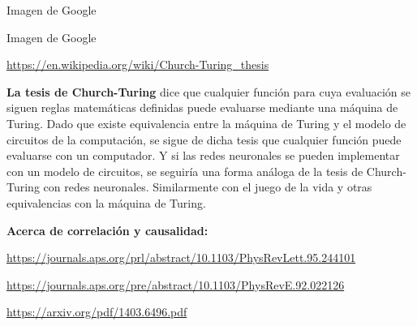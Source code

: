 \documentclass[10pd,hyperref={colorlinks=true}]{beamer}
\begin{document}

\begin{frame}{}

 \vfill
 \centerline{}
 \vfill
 \centerline{}
 \vfill
 \centerline{\tiny Imagen de Google}
 \vfill

 \end{frame}


\begin{frame}{}

 \vfill
 \centerline{}
 \vfill
 \centerline{\tiny Imagen de Google}

 \vfill

\end{frame}


\begin{frame}{}
 \vfill

\url{https://en.wikipedia.org/wiki/Church-Turing_thesis}
 \vfill

{\bf La tesis de Church-Turing} dice que cualquier función para cuya 
evaluación se siguen reglas matemáticas definidas puede evaluarse 
mediante una máquina de Turing. Dado que existe equivalencia entre la 
máquina de Turing y el modelo de circuitos de la computación, se sigue 
de dicha tesis que cualquier función puede evaluarse con un computador. 
Y si las redes neuronales se pueden implementar con un modelo de 
circuitos, se seguiría una forma análoga de la tesis de Church-Turing 
con redes neuronales. Similarmente con el juego de la vida y otras 
equivalencias con la máquina de Turing.

 \vfill

\centerline{\bf Acerca de correlación y causalidad:}

\url{https://journals.aps.org/prl/abstract/10.1103/PhysRevLett.95.244101}

\url{https://journals.aps.org/pre/abstract/10.1103/PhysRevE.92.022126}

\url{https://arxiv.org/pdf/1403.6496.pdf}

 \vfill

 \end{frame}
\end{document}
